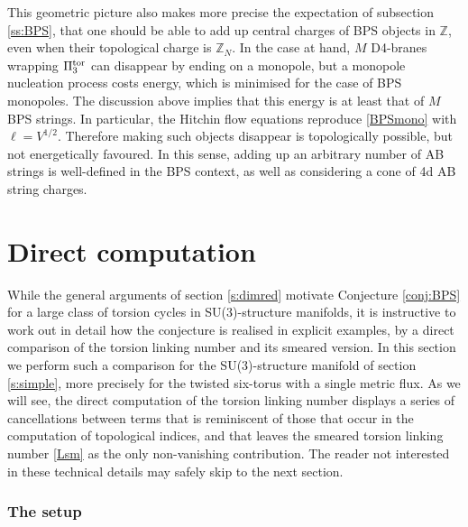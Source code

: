 \documentclass[11pt]{article}
\newcommand{\IZ}{\mathbb{Z}}
\begin{document}
This geometric picture also makes more precise the expectation of subsection \ref{ss:BPS}, that one should be able to add up central charges of BPS objects in $\IZ$, even when their topological charge is $\IZ_N$. In the case at hand, $M$ D4-branes wrapping $\Pi_3^{\rm tor}$ can disappear by ending on a monopole, but a monopole nucleation process costs  energy, which is minimised for the case of BPS monopoles. The discussion above implies that this energy is at least that of $M$ BPS strings. In particular, the Hitchin flow equations reproduce \eqref{BPSmono} with $\ell =V^{1/2}$. Therefore making such objects disappear is topologically possible, but not energetically favoured. In this sense, adding up an arbitrary number of  AB strings is well-defined in the BPS context, as well as considering a cone of 4d AB string charges. 


\section{Direct computation}
\label{s:direct}

While the general arguments of section \ref{s:dimred} motivate Conjecture \ref{conj:BPS} for a large class of torsion cycles in SU(3)-structure manifolds, it is instructive to work out in detail how the conjecture is realised in explicit examples, by a direct comparison of the torsion linking number and its smeared version. In this section we perform such a comparison for the SU(3)-structure manifold of section \ref{s:simple}, more precisely for the twisted six-torus with a single metric flux. As we will see, the direct computation of the torsion linking number displays a series of cancellations between terms that is reminiscent of those that occur in the computation of topological indices, and that leaves the smeared torsion linking number \eqref{Lsm} as the only non-vanishing contribution. The reader not interested in these technical details may safely skip to the next section. 


\subsubsection*{The setup}
\end{document}

